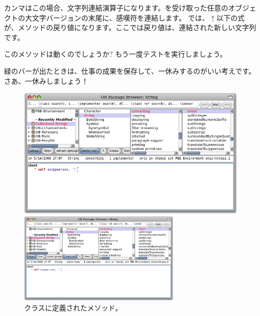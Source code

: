 \documentclass[a4paper,10pt,twoside]{book}
\begin{document}
カンマはこの場合、文字列連結演算子になります。を受け取った任意のオブジェクトの大文字バージョンの末尾に、感嘆符を連結します。
\pharo では、$\uparrow$以下の式が、メソッドの戻り値になります。ここでは戻り値は、連結された新しい文字列です。

このメソッドは動くのでしょうか? もう一度テストを実行しましょう。

緑のバーが出たときは、仕事の成果を保存して、一休みするのがいい考えです。
さあ、一休みしましょう！

\begin{figure}[hbt]
\ifluluelse
	{\centerline{\includegraphics[width=\textwidth]{String-Shout}}}
	{\centerline{\includegraphics[width=0.7\textwidth]{String-Shout}}}
\caption{クラスに定義されたメソッド。
}
\end{figure}
\end{document}
